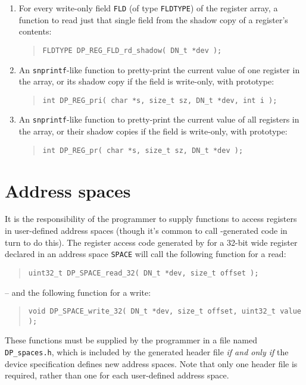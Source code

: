 \documentclass[a4paper,11pt,twoside]{report}
\begin{document}
\begin{enumerate}
\item For every write-only field \texttt{FLD} (of type \texttt{FLDTYPE})
  of the register array, a function to read just that single field from the
  shadow copy of a register's contents: 
  \begin{quote}
    \texttt{FLDTYPE DP\_REG\_FLD\_rd\_shadow( DN\_t *dev );}
  \end{quote}
  
\item An \texttt{snprintf}-like function to pretty-print the
  current value of one register in the array, or its shadow copy
  if the field is write-only, with prototype:
  \begin{quote}
    \texttt{int DP\_REG\_pri( char *s, size\_t sz, DN\_t *dev, int i );}
  \end{quote}
  
\item An \texttt{snprintf}-like function to pretty-print the
  current value of all registers in the array, or their shadow copies
  if the field is write-only, with prototype:
  \begin{quote}
    \texttt{int DP\_REG\_pr( char *s, size\_t sz, DN\_t *dev );}
  \end{quote}

\end{enumerate}

\section{Address spaces}\label{sec:c-spaces}

It is the responsibility of the programmer to supply functions to
access registers in user-defined address spaces (though it's common to
call \Mac{}-generated code in turn to do this).   The register access
code generated by \Mac for a 32-bit wide register declared in an
address space \texttt{SPACE} will call the following function for a
read:
  \begin{quote}
    \texttt{uint32\_t DP\_SPACE\_read\_32( DN\_t *dev, size\_t offset );}
  \end{quote}
-- and the following function for a write:
  \begin{quote}
    \texttt{void DP\_SPACE\_write\_32( DN\_t *dev, size\_t offset,
      uint32\_t value );}
  \end{quote}

These functions must be supplied by the programmer in a file named
\texttt{DP\_spaces.h}, which is included by the generated header file
\emph{if and only if} the device specification defines new address
spaces.  Note that only one header file is required, rather than one
for each user-defined address space.
\end{document}
